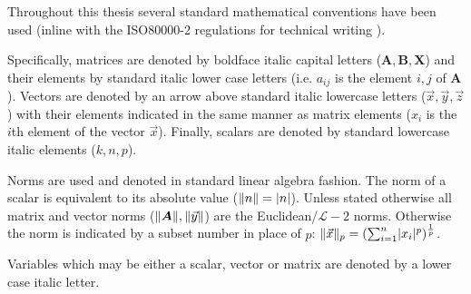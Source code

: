 Throughout this thesis several standard mathematical conventions have been used 
(inline with the ISO80000-2 regulations for technical writing \citet{ISO2009}).

Specifically, matrices are denoted by boldface italic capital letters 
(\(\bm{A}, \bm{B}, \bm{X}\)) 
and their elements by standard italic lower case letters 
(i.e. \(a_{ij}\) is the element \(i,j\) of \(\bm{A}\)). 
Vectors are denoted by an arrow above standard italic lowercase letters 
(\(\vec{x}, \vec{y}, \vec{z}\)) with their elements 
indicated in the same manner as matrix elements (\(x_{i}\) is the 
\(i\)th element of the vector \(\vec{x}\)).
Finally, scalars are denoted by standard lowercase italic elements (\(k, n, p\)).

Norms are used and denoted in standard linear algebra fashion. 
The norm of a scalar is equivalent to its absolute value (\(\lVert n\rVert = \lvert n\rvert\)).
Unless stated otherwise all matrix and vector norms 
(\(\lVert\bm{A}\rVert, \lVert\vec{y}\rVert\)) are the Euclidean/\(\mathcal{L}-2\) norms.
Otherwise the norm is indicated by a subset number in place of \(p\):
\(\lVert\vec{x}\rVert_{p} = (\sum^{n}_{i=1} \lvert x_{i}\rvert^{p})^{\frac{1}{p}}\).

Variables which may be either a scalar, vector or matrix are denoted by a lower case italic letter.

